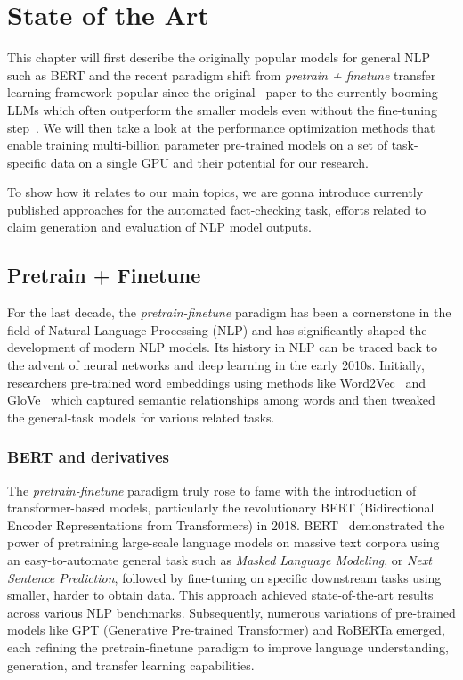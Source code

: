 
\chapter{State of the Art}

This chapter will first describe the originally popular models for general NLP such as BERT and the recent paradigm shift from \textit{pretrain + finetune} transfer learning framework popular since the original~\cite{devlin2019bert} paper to the currently booming LLMs which often outperform the smaller models even without the fine-tuning step~\cite{gpt4,llama,vicuna}. We will then take a look at the performance optimization methods that enable training multi-billion parameter pre-trained models on a set of task-specific data on a single GPU and their potential for our research. 

To show how it relates to our main topics, we are gonna introduce currently published approaches for the automated fact-checking task, efforts related to claim generation and evaluation of NLP model outputs.

\label{chap:sota}
\section{Pretrain + Finetune}
\label{sec:pretrain}
For the last decade, the \textit{pretrain-finetune} paradigm has been a cornerstone in the field of Natural Language Processing (NLP) and has significantly shaped the development of modern NLP models. Its history in NLP can be traced back to the advent of neural networks and deep learning in the early 2010s. Initially, researchers pre-trained word embeddings using methods like Word2Vec~\cite{mikolov} and GloVe~\cite{pennington-etal-2014-glove} which captured semantic relationships among words and then tweaked the general-task models for various related tasks.

\subsection{BERT and derivatives}\label{sec:bert}
The \textit{pretrain-finetune} paradigm truly rose to fame with the introduction of transformer-based models, particularly the revolutionary BERT (Bidirectional Encoder Representations from Transformers) in 2018. BERT~\cite{devlin2019bert} demonstrated the power of pretraining large-scale language models on massive text corpora using an easy-to-automate general task such as \textit{Masked Language Modeling}, or \textit{Next Sentence Prediction}, followed by fine-tuning on specific downstream tasks using smaller, harder to obtain data. This approach achieved state-of-the-art results across various NLP benchmarks. Subsequently, numerous variations of pre-trained models like GPT (Generative Pre-trained Transformer) and RoBERTa emerged, each refining the pretrain-finetune paradigm to improve language understanding, generation, and transfer learning capabilities. 

